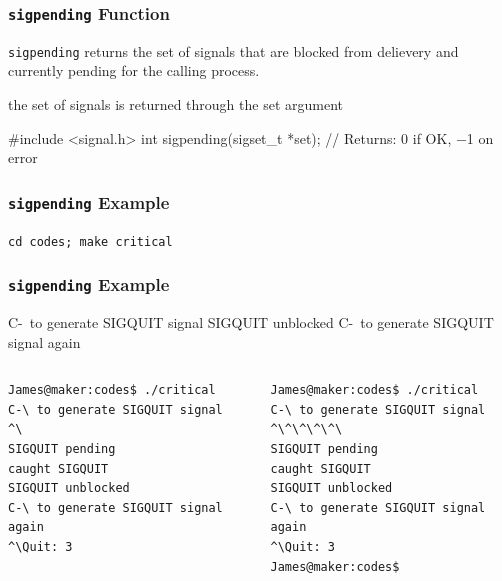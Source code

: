 \documentclass[newPxFont,sthlmFooter,nooffset]{beamer}
\begin{document}
\begin{frame}[fragile,t]
  \frametitle{\texttt{sigpending} Function}

\texttt{sigpending} returns the set of signals that are blocked from delievery and currently pending for the calling process.

the set of signals is returned through the set argument
\begin{codedef}
#include <signal.h>
int sigpending(sigset_t *set);
// Returns: 0 if OK, −1 on error  
\end{codedef}
\end{frame}




\begin{frame}
  \frametitle{\texttt{sigpending} Example}

\texttt{cd codes; make critical}


\end{frame}




\begin{frame}[fragile,t]
  \frametitle{\texttt{sigpending} Example}
C-\ to generate SIGQUIT signal
SIGQUIT unblocked
C-\ to generate SIGQUIT signal again

\begin{columns}[t]
\begin{column}{0.5\linewidth}
{\footnotesize
\begin{verbatim}
James@maker:codes$ ./critical
C-\ to generate SIGQUIT signal
^\
SIGQUIT pending
caught SIGQUIT
SIGQUIT unblocked
C-\ to generate SIGQUIT signal again
^\Quit: 3
\end{verbatim} 
}
\end{column}
\begin{column}{0.5\linewidth}
{\footnotesize
\begin{verbatim}
James@maker:codes$ ./critical
C-\ to generate SIGQUIT signal
^\^\^\^\^\
SIGQUIT pending
caught SIGQUIT
SIGQUIT unblocked
C-\ to generate SIGQUIT signal again
^\Quit: 3
James@maker:codes$
\end{verbatim}
}
\end{column}
\end{columns}



  
\end{frame}
\end{document}
